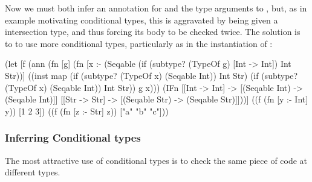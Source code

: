 Now we must both infer an annotation for  and
the type arguments to , but, as
in example motivating conditional types,
this is aggravated by  being given a
intersection type, and thus forcing its body to be checked twice.
The solution is to to use more conditional types, particularly
as in the instantiation of :

\begin{cljlisting}
(let [f (ann (fn [g]
               (fn [x :- (Seqable (if (subtype? (TypeOf g) [Int -> Int]) Int Str))]
                 ((inst map
                        (if (subtype? (TypeOf x) (Seqable Int)) Int Str)
                        (if (subtype? (TypeOf x) (Seqable Int)) Int Str))
                  g x)))
             (IFn [[Int -> Int] -> [(Seqable Int) -> (Seqable Int)]]
                  [[Str -> Str] -> [(Seqable Str) -> (Seqable Str)]]))]
  ((f (fn [y :- Int] y)) [1 2 3])
  ((f (fn [z :- Str] z)) ["a" "b" "c"]))
\end{cljlisting}

\subsubsection{Inferring Conditional types}

The most attractive use of conditional types is to check the
same piece of code at different types.

